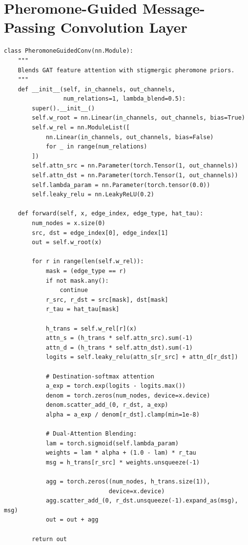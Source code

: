 \section{Pheromone-Guided Message-Passing Convolution Layer}
\begin{footnotesize}
\begin{verbatim}
class PheromoneGuidedConv(nn.Module):
    """
    Blends GAT feature attention with stigmergic pheromone priors.
    """
    def __init__(self, in_channels, out_channels, 
                 num_relations=1, lambda_blend=0.5):
        super().__init__()
        self.w_root = nn.Linear(in_channels, out_channels, bias=True)
        self.w_rel = nn.ModuleList([
            nn.Linear(in_channels, out_channels, bias=False) 
            for _ in range(num_relations)
        ])
        self.attn_src = nn.Parameter(torch.Tensor(1, out_channels))
        self.attn_dst = nn.Parameter(torch.Tensor(1, out_channels))
        self.lambda_param = nn.Parameter(torch.tensor(0.0))
        self.leaky_relu = nn.LeakyReLU(0.2)

    def forward(self, x, edge_index, edge_type, hat_tau):
        num_nodes = x.size(0)
        src, dst = edge_index[0], edge_index[1]
        out = self.w_root(x)

        for r in range(len(self.w_rel)):
            mask = (edge_type == r)
            if not mask.any(): 
                continue
            r_src, r_dst = src[mask], dst[mask]
            r_tau = hat_tau[mask]

            h_trans = self.w_rel[r](x)
            attn_s = (h_trans * self.attn_src).sum(-1)
            attn_d = (h_trans * self.attn_dst).sum(-1)
            logits = self.leaky_relu(attn_s[r_src] + attn_d[r_dst])

            # Destination-softmax attention
            a_exp = torch.exp(logits - logits.max())
            denom = torch.zeros(num_nodes, device=x.device)
            denom.scatter_add_(0, r_dst, a_exp)
            alpha = a_exp / denom[r_dst].clamp(min=1e-8)

            # Dual-Attention Blending:
            lam = torch.sigmoid(self.lambda_param)
            weights = lam * alpha + (1.0 - lam) * r_tau
            msg = h_trans[r_src] * weights.unsqueeze(-1)

            agg = torch.zeros((num_nodes, h_trans.size(1)), 
                              device=x.device)
            agg.scatter_add_(0, r_dst.unsqueeze(-1).expand_as(msg), msg)
            out = out + agg

        return out
\end{verbatim}
\end{footnotesize}

